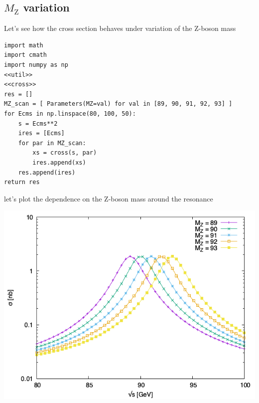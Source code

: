 \documentclass[11pt]{article}
\begin{document}
\subsection{\(M_\mathrm{Z}\) variation}
\label{sec:org0380372}
Let's see how the cross section behaves under variation of the Z-boson mass
\begin{verbatim}
import math
import cmath
import numpy as np
<<util>>
<<cross>>
res = []
MZ_scan = [ Parameters(MZ=val) for val in [89, 90, 91, 92, 93] ]
for Ecms in np.linspace(80, 100, 50):
    s = Ecms**2
    ires = [Ecms]
    for par in MZ_scan:
        xs = cross(s, par)
        ires.append(xs)
    res.append(ires)
return res
\end{verbatim}
let's plot the dependence on the Z-boson mass around the resonance
\begin{center}
\includegraphics[width=.9\linewidth]{MZ_var.png}
\end{center}
\end{document}
